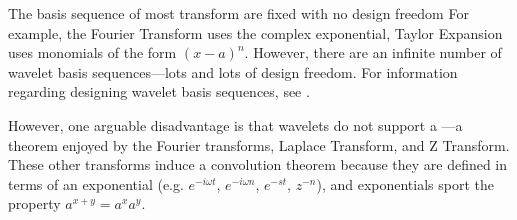 The basis sequence of most transform are fixed with no design freedom 
For example, the Fourier Transform uses the complex exponential, Taylor Expansion uses 
monomials of the form $(x-a)^n$.
However, there are an infinite number of wavelet basis sequences---lots and lots of design freedom.
For information regarding designing wavelet basis sequences, see .

However, one arguable disadvantage is that wavelets do not support a ---a theorem 
enjoyed by the Fourier transforms, Laplace Transform, and Z Transform.
These other transforms induce a convolution theorem because they are defined in terms of an exponential
(e.g. $e^{-i\omega t}$, $e^{-i\omega n}$, $e^{-st}$, $z^{-n}$),
and exponentials sport the property $a^{x+y}=a^xa^y$.
